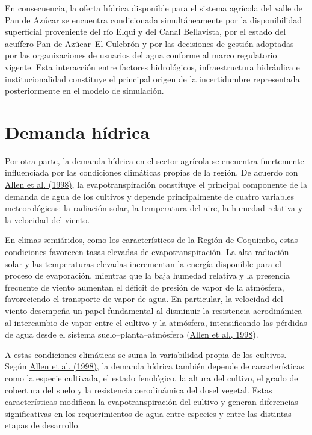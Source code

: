 \documentclass[12pt]{report}
\newcommand{\citeref}[2]{\hyperlink{ref:#1}{#2}}
\begin{document}
En consecuencia, la oferta hídrica disponible para el sistema agrícola del valle de Pan de Azúcar se encuentra condicionada simultáneamente por la disponibilidad superficial proveniente del río Elqui y del Canal Bellavista, por el estado del acuífero Pan de Azúcar–El Culebrón y por las decisiones de gestión adoptadas por las organizaciones de usuarios del agua conforme al marco regulatorio vigente. Esta interacción entre factores hidrológicos, infraestructura hidráulica e institucionalidad constituye el principal origen de la incertidumbre representada posteriormente en el modelo de simulación. 

\section{Demanda hídrica}

Por otra parte, la demanda hídrica en el sector agrícola se encuentra fuertemente influenciada por las condiciones climáticas propias de la región. De acuerdo con \citeref{allen1998}{Allen et al. (1998)}, la evapotranspiración constituye el principal componente de la demanda de agua de los cultivos y depende principalmente de cuatro variables meteorológicas: la radiación solar, la temperatura del aire, la humedad relativa y la velocidad del viento.

En climas semiáridos, como los característicos de la Región de Coquimbo, estas condiciones favorecen tasas elevadas de evapotranspiración. La alta radiación solar y las temperaturas elevadas incrementan la energía disponible para el proceso de evaporación, mientras que la baja humedad relativa y la presencia frecuente de viento aumentan el déficit de presión de vapor de la atmósfera, favoreciendo el transporte de vapor de agua. En particular, la velocidad del viento desempeña un papel fundamental al disminuir la resistencia aerodinámica al intercambio de vapor entre el cultivo y la atmósfera, intensificando las pérdidas de agua desde el sistema suelo--planta--atmósfera (\citeref{allen1998}{Allen et al., 1998}).

A estas condiciones climáticas se suma la variabilidad propia de los cultivos. Según \citeref{allen1998}{Allen et al. (1998)}, la demanda hídrica también depende de características como la especie cultivada, el estado fenológico, la altura del cultivo, el grado de cobertura del suelo y la resistencia aerodinámica del dosel vegetal. Estas características modifican la evapotranspiración del cultivo y generan diferencias significativas en los requerimientos de agua entre especies y entre las distintas etapas de desarrollo.
\end{document}
